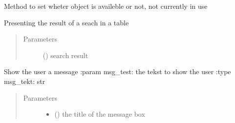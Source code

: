 \documentclass[letterpaper,10pt,english]{sphinxmanual}
\begin{document}
\begin{fulllineitems}
\begin{fulllineitems}
\end{fulllineitems}


\begin{fulllineitems}
\label{\detokenize{code:Tilgjengelighet.Tilgjengelighet.set_availebility_icon}}
Method to set wheter object is availeble or not, not currently in use

\end{fulllineitems}


\begin{fulllineitems}
\label{\detokenize{code:Tilgjengelighet.Tilgjengelighet.showResults}}
Presenting the result of a seach in a table
\begin{quote}\begin{description}
\item[{Parameters}] \leavevmode
{} () \textendash{} search result

\end{description}\end{quote}

\end{fulllineitems}


\begin{fulllineitems}
\label{\detokenize{code:Tilgjengelighet.Tilgjengelighet.show_message}}
Show the user a message
:param msg\_test: the tekst to show the user
:type msg\_tekt: str
\begin{quote}\begin{description}
\item[{Parameters}] \leavevmode\begin{itemize}
\item {} 
 () \textendash{} the title of the message box


\end{itemize}
\end{description}
\end{quote}
\end{fulllineitems}
\end{fulllineitems}
\end{document}
